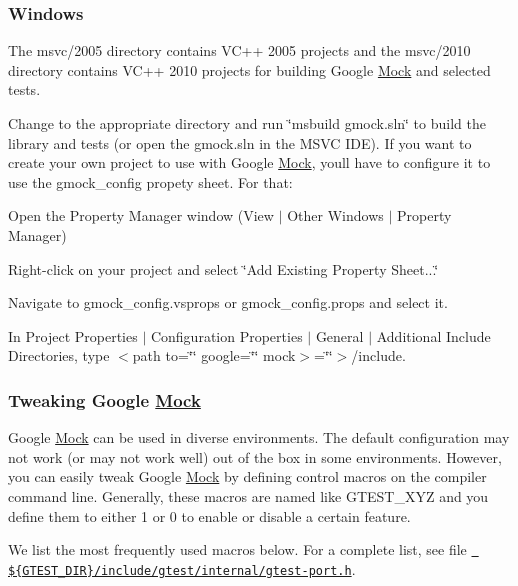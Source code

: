 \subsubsection*{Windows}

The msvc/2005 directory contains V\+C++ 2005 projects and the msvc/2010 directory contains V\+C++ 2010 projects for building Google \mbox{\hyperlink{classMock}{Mock}} and selected tests.

Change to the appropriate directory and run \char`\"{}msbuild gmock.\+sln\char`\"{} to build the library and tests (or open the gmock.\+sln in the M\+S\+VC I\+DE). If you want to create your own project to use with Google \mbox{\hyperlink{classMock}{Mock}}, you\textquotesingle{}ll have to configure it to use the {\ttfamily gmock\+\_\+config} propety sheet. For that\+:


\begin{DoxyItemize}
\item Open the Property Manager window (View $\vert$ Other Windows $\vert$ Property Manager)
\item Right-\/click on your project and select \char`\"{}\+Add Existing Property Sheet...\char`\"{}
\item Navigate to {\ttfamily gmock\+\_\+config.\+vsprops} or {\ttfamily gmock\+\_\+config.\+props} and select it.
\item In Project Properties $\vert$ Configuration Properties $\vert$ General $\vert$ Additional Include Directories, type $<$path to=\char`\"{}\char`\"{} google=\char`\"{}\char`\"{} mock$>$=\char`\"{}\char`\"{}$>$/include.
\end{DoxyItemize}

\subsubsection*{Tweaking Google \mbox{\hyperlink{classMock}{Mock}}}

Google \mbox{\hyperlink{classMock}{Mock}} can be used in diverse environments. The default configuration may not work (or may not work well) out of the box in some environments. However, you can easily tweak Google \mbox{\hyperlink{classMock}{Mock}} by defining control macros on the compiler command line. Generally, these macros are named like {\ttfamily G\+T\+E\+S\+T\+\_\+\+X\+YZ} and you define them to either 1 or 0 to enable or disable a certain feature.

We list the most frequently used macros below. For a complete list, see file \href{../googletest/include/gtest/internal/gtest-port.h}{\texttt{ \$\{G\+T\+E\+S\+T\+\_\+\+D\+IR\}/include/gtest/internal/gtest-\/port.h}}.

